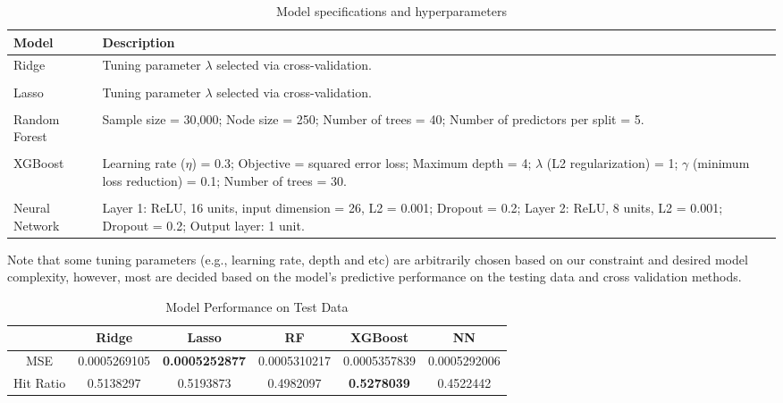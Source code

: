 \documentclass[oneside, 12pt]{article}
\newcommand*{\1}{\text{\scalebox{1.1}{\usefont{U}{bbold}{m}{n}1}}}
\begin{document}
\begin{table}[h!]
\centering
\begin{tabular}{p{3cm} p{11cm}}
\toprule
\textbf{Model} & \textbf{Description} \\
\midrule

Ridge & Tuning parameter $\lambda$ selected via cross-validation. \\

& \\

Lasso & Tuning parameter $\lambda$ selected via cross-validation. \\

& \\

Random Forest & 
Sample size = 30{,}000; 
Node size = 250; 
Number of trees = 40; 
Number of predictors per split = 5. \\
& \\

XGBoost & 
Learning rate ($\eta$) = 0.3; 
Objective = squared error loss; 
Maximum depth = 4; 
$\lambda$ (L2 regularization) = 1; 
$\gamma$ (minimum loss reduction) = 0.1; 
Number of trees = 30. \\

& \\

Neural Network & 
Layer 1: ReLU, 16 units, input dimension = 26, L2 = 0.001; 
Dropout = 0.2; 
Layer 2: ReLU, 8 units, L2 = 0.001; 
Dropout = 0.2; 
Output layer: 1 unit. \\

\bottomrule
\end{tabular}
\caption{Model specifications and hyperparameters}
\end{table}
Note that some tuning parameters (e.g., learning rate, depth and etc) are arbitrarily chosen based on our constraint and desired model complexity, however, most are decided based on the model's predictive performance on the testing data and cross validation methods. 


\begin{table}[h!]
  \centering
  \begin{tabular}{cccccc}
  \hline
  & Ridge & Lasso & RF & XGBoost & NN \\
  \hline
\rule{0pt}{3ex} MSE & 0.0005269105 & \textbf{0.0005252877} & 0.0005310217 & 0.0005357839 & 0.0005292006 \\
 Hit Ratio & 0.5138297 & 0.5193873 & 0.4982097 & \textbf{0.5278039} & 0.4522442 \\
 \hline
 \end{tabular}
  \caption{Model Performance on Test Data}
  \label{perf_summary}
\end{table}
\end{document}
